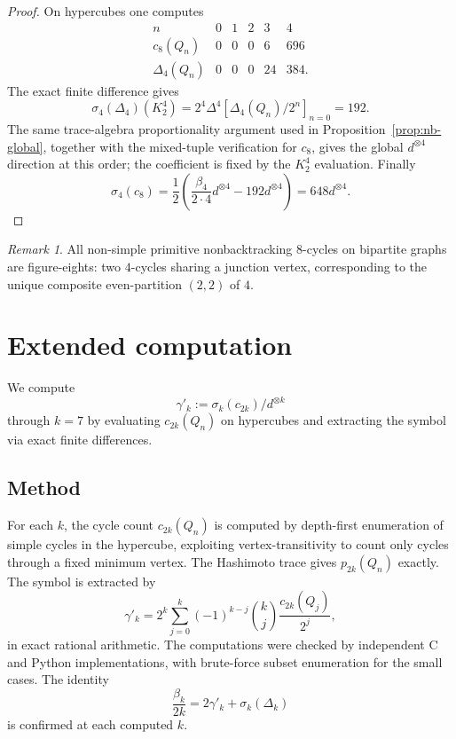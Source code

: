 \documentclass[11pt]{amsart}
\theoremstyle{definition}
\theoremstyle{remark}
\newtheorem{remark}[theorem]{Remark}
\begin{document}
\begin{proof}
On hypercubes one computes
\[
\begin{array}{c|ccccc}
 n&0&1&2&3&4\\ \hline
 c_8(Q_n)&0&0&0&6&696\\
 \Delta_4(Q_n)&0&0&0&24&384.
\end{array}
\]
The exact finite difference gives
\[
   \sigma_4(\Delta_4)(K_2^4)=2^4\Delta^4[\Delta_4(Q_n)/2^n]_{n=0}=192.
\]
The same trace-algebra proportionality argument used in Proposition~\ref{prop:nb-global}, together with the mixed-tuple verification for $c_8$, gives the global $d^{\otimes4}$ direction at this order; the coefficient is fixed by the $K_2^4$ evaluation. Finally
\[
   \sigma_4(c_8)=\frac{1}{2}\left(\frac{\beta_4}{2\cdot4}d^{\otimes4}-192d^{\otimes4}\right)=648d^{\otimes4}.
\]
\end{proof}

\begin{remark}\label{rem:figure-eight}
All non-simple primitive nonbacktracking $8$-cycles on bipartite graphs are figure-eights: two $4$-cycles sharing a junction vertex, corresponding to the unique composite even-partition $(2,2)$ of $4$.
\end{remark}

\section{Extended computation}\label{sec:extended-computation}

We compute
\[
   \gamma'_k:=\sigma_k(c_{2k})/d^{\otimes k}
\]
through $k=7$ by evaluating $c_{2k}(Q_n)$ on hypercubes and extracting the symbol via exact finite differences.

\subsection{Method}
For each $k$, the cycle count $c_{2k}(Q_n)$ is computed by depth-first enumeration of simple cycles in the hypercube, exploiting vertex-transitivity to count only cycles through a fixed minimum vertex. The Hashimoto trace gives $p_{2k}(Q_n)$ exactly. The symbol is extracted by
\[
   \gamma'_k=2^k\sum_{j=0}^k(-1)^{k-j}\binom{k}{j}\frac{c_{2k}(Q_j)}{2^j},
\]
in exact rational arithmetic. The computations were checked by independent C and Python implementations, with brute-force subset enumeration for the small cases. The identity
\[
   \frac{\beta_k}{2k}=2\gamma'_k+\sigma_k(\Delta_k)
\]
is confirmed at each computed $k$.
\end{document}
